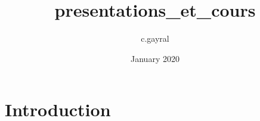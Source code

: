 \documentclass{article}
\title{presentations_et_cours}
\author{c.gayral }
\date{January 2020}
\begin{document}
\maketitle

\section{Introduction}
\end{document}
